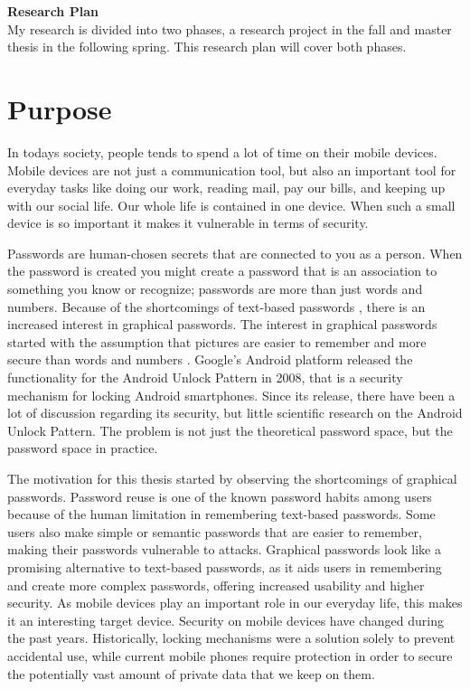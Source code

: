 
{\bf \Huge Research Plan} \\[0.5cm]

  My research is divided into two phases, a research project in the fall and master thesis in the following spring. This research plan will cover both phases.

  \section*{Purpose}


  In todays society, people tends to spend a lot of time on their mobile devices. Mobile devices are not just a communication tool, but also an important tool for everyday tasks like doing our work, reading mail, pay our bills, and keeping up with our social life. Our whole life is contained in one device. When such a small device is so important it makes it vulnerable in terms of security.

  Passwords are human-chosen secrets that are connected to you as a person. When the password is created you might create a password that is an association to something you know or recognize; passwords are more than just words and numbers. Because of the shortcomings of text-based passwords \cite{UnixPasswords}, there is an increased interest in graphical passwords. The interest in graphical passwords started with the assumption that pictures are easier to remember and more secure than words and numbers \cite{DeAngeli}. Google's Android platform released the functionality for the Android Unlock Pattern in 2008, that is a security mechanism for locking Android smartphones. Since its release, there have been a lot of discussion regarding its security, but little scientific research on the Android Unlock Pattern. The problem is not just the theoretical password space, but the password space in practice. 

  The motivation for this thesis started by observing the shortcomings of graphical passwords. Password reuse is one of the known password habits among users because of the human limitation in remembering text-based passwords. Some users also make simple or semantic passwords that are easier to remember, making their passwords vulnerable to attacks. Graphical passwords look like a promising alternative to text-based passwords, as it aids users in remembering and create more complex passwords, offering increased usability and higher security. As mobile devices play an important role in our everyday life, this makes it an interesting target device. Security on mobile devices have changed during the past years. Historically, locking mechanisms were a solution solely to prevent accidental use, while current mobile phones require protection in order to secure the potentially vast amount of private data that we keep on them.

